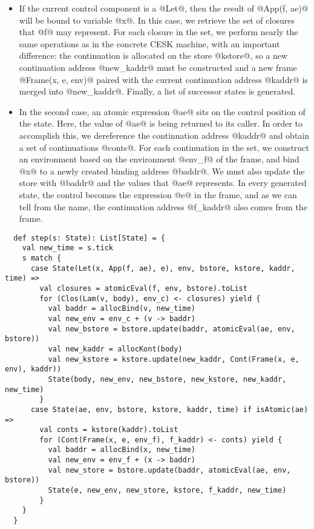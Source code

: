 \documentclass[acmsmall, review]{acmart}\settopmatter{}
\begin{document}
\begin{itemize}
  \item If the current control component is a @Let@, then the result of @App(f, ae)@ will 
    be bound to variable @x@. In this case, we retrieve the set of closures that @f@ may 
    represent. For each closure in the set, we perform nearly the same operations as in the
    concrete CESK machine, with an important difference: the continuation is allocated on 
    the store @kstore@, so a new continuation address @new_kaddr@ must be constructed and 
    a new frame @Frame(x, e, env)@ paired with the current continuation address @kaddr@ is 
    merged into @new_kaddr@. Finally, a list of successor states is generated.

  \item In the second case, an atomic expression @ae@ sits on the control position of the
    state. Here, the value of @ae@ is being returned to its caller.
    In order to accomplish this, we dereference the continuation address @kaddr@ and obtain 
    a set of continuations @conts@. For each continuation in the set, we construct an 
    environment based on the environment @env_f@ of the frame, and bind @x@ to a newly 
    created binding address @baddr@. We must also update the store with @baddr@ and the 
    values that @ae@ represents. In every generated state, the control becomes the expression 
    @e@ in the frame, and as we can tell from the name, the continuation address @f_kaddr@ 
    also comes from the frame.
\end{itemize}

\begin{lstlisting}
  def step(s: State): List[State] = {
    val new_time = s.tick
    s match {
      case State(Let(x, App(f, ae), e), env, bstore, kstore, kaddr, time) =>
        val closures = atomicEval(f, env, bstore).toList
        for (Clos(Lam(v, body), env_c) <- closures) yield {
          val baddr = allocBind(v, new_time)
          val new_env = env_c + (v -> baddr)
          val new_bstore = bstore.update(baddr, atomicEval(ae, env, bstore))
          val new_kaddr = allocKont(body)
          val new_kstore = kstore.update(new_kaddr, Cont(Frame(x, e, env), kaddr))
          State(body, new_env, new_bstore, new_kstore, new_kaddr, new_time)
        }
      case State(ae, env, bstore, kstore, kaddr, time) if isAtomic(ae) =>
        val conts = kstore(kaddr).toList
        for (Cont(Frame(x, e, env_f), f_kaddr) <- conts) yield {
          val baddr = allocBind(x, new_time)
          val new_env = env_f + (x -> baddr)
          val new_store = bstore.update(baddr, atomicEval(ae, env, bstore))
          State(e, new_env, new_store, kstore, f_kaddr, new_time)
        }
    }
  }
\end{lstlisting}
\end{document}
